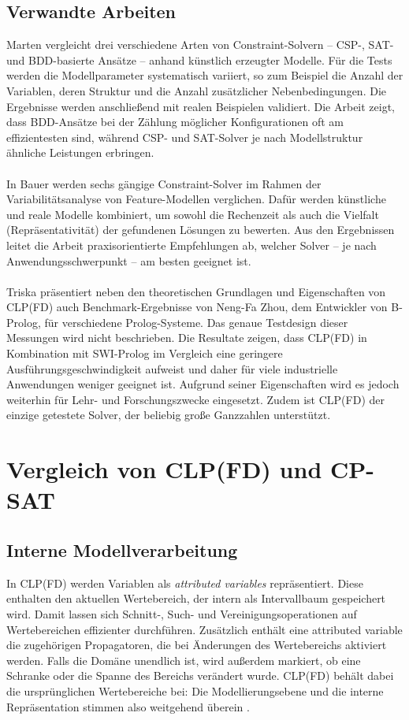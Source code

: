 \documentclass[12pt,a4paper]{article}
\begin{document}
\subsection{Verwandte Arbeiten}
Marten \cite{marten2018} vergleicht drei verschiedene Arten von Constraint-Solvern – CSP-, SAT- und BDD-basierte Ansätze – anhand künstlich erzeugter Modelle.
Für die Tests werden die Modellparameter systematisch variiert, so zum Beispiel die Anzahl der Variablen, deren Struktur und die Anzahl zusätzlicher Nebenbedingungen.
Die Ergebnisse werden anschließend mit realen Beispielen validiert.
Die Arbeit zeigt, dass BDD-Ansätze bei der Zählung möglicher Konfigurationen oft am effizientesten sind, während CSP- und SAT-Solver je nach Modellstruktur ähnliche Leistungen erbringen.\\
\\
In Bauer \cite{bauer2019} werden sechs gängige Constraint-Solver im Rahmen der Variabilitätsanalyse von Feature-Modellen verglichen.
Dafür werden künstliche und reale Modelle kombiniert, um sowohl die Rechenzeit als auch die Vielfalt (Repräsentativität) der gefundenen Lösungen zu bewerten.
Aus den Ergebnissen leitet die Arbeit praxisorientierte Empfehlungen ab, welcher Solver – je nach Anwendungsschwerpunkt – am besten geeignet ist.\\
\\
Triska \cite{drt} präsentiert neben den theoretischen Grundlagen und Eigenschaften von CLP(FD) auch Benchmark-Ergebnisse von Neng-Fa Zhou, dem Entwickler von B-Prolog, für verschiedene Prolog-Systeme.
Das genaue Testdesign dieser Messungen wird nicht beschrieben.
Die Resultate zeigen, dass CLP(FD) in Kombination mit SWI-Prolog im Vergleich eine geringere Ausführungsgeschwindigkeit aufweist und daher für viele industrielle Anwendungen weniger geeignet ist.
Aufgrund seiner Eigenschaften wird es jedoch weiterhin für Lehr- und Forschungszwecke eingesetzt.
Zudem ist CLP(FD) der einzige getestete Solver, der beliebig große Ganzzahlen unterstützt. 
\section{Vergleich von CLP(FD) und CP-SAT}
\subsection{Interne Modellverarbeitung}
In CLP(FD) werden Variablen als \emph{attributed variables} repräsentiert. 
Diese enthalten den aktuellen Wertebereich, der intern als Intervallbaum gespeichert wird. 
Damit lassen sich Schnitt-, Such- und Vereinigungsoperationen auf Wertebereichen effizienter durchführen. 
Zusätzlich enthält eine attributed variable die zugehörigen Propagatoren, die bei Änderungen des Wertebereichs aktiviert werden. 
Falls die Domäne unendlich ist, wird außerdem markiert, ob eine Schranke oder die Spanne des Bereichs verändert wurde.
CLP(FD) behält dabei die ursprünglichen Wertebereiche bei: Die Modellierungsebene und die interne Repräsentation stimmen also weitgehend überein \cite{drt}.
\end{document}
